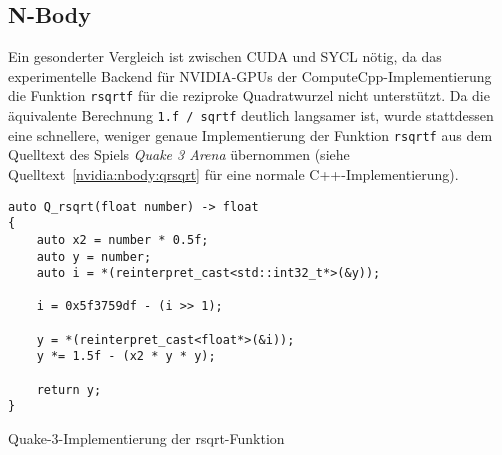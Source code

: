 \subsection{N-Body}

Ein gesonderter Vergleich ist zwischen CUDA und SYCL nötig, da das
experimentelle Backend für NVIDIA-GPUs der ComputeCpp-Implementierung die
Funktion \texttt{rsqrtf} für die reziproke Quadratwurzel nicht unterstützt. Da
die äquivalente Berechnung \texttt{1.f / sqrtf} deutlich langsamer ist, wurde
stattdessen eine schnellere, weniger genaue Implementierung der Funktion
\texttt{rsqrtf} aus dem Quelltext des Spiels \textit{Quake 3 Arena} übernommen
(siehe Quelltext~\ref{nvidia:nbody:qrsqrt} für eine normale
C++-Implementierung).

\begin{code}
    \begin{verbatim}
auto Q_rsqrt(float number) -> float
{
    auto x2 = number * 0.5f;
    auto y = number;
    auto i = *(reinterpret_cast<std::int32_t*>(&y));

    i = 0x5f3759df - (i >> 1);

    y = *(reinterpret_cast<float*>(&i));
    y *= 1.5f - (x2 * y * y);

    return y;
}
    \end{verbatim}
    \caption{Quake-3-Implementierung der rsqrt-Funktion}
    \label{nvidia:nbody:qrsqrt}
\end{code}
